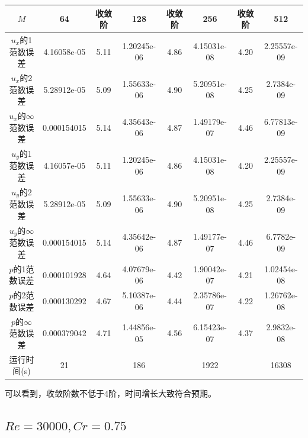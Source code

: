 \documentclass[lang=cn,10pt,bibend=bibtex]{elegantbook}
\begin{document}
\begin{table}[H]
  \centering
  \small
  \begin{tabular}{c|ccccccc}
  \textbf{$M$}              & 64          & 收敛阶 & 128         & 收敛阶 & 256         & 收敛阶 & 512   \\ \hline
  $u_x$的1范数误差                  & 4.16058e-05 &  5.11 & 1.20245e-06 &  4.86 & 4.15031e-08 &  4.20 & 2.25557e-09 \\
  $u_x$的2范数误差                  & 5.28912e-05 &  5.09 & 1.55633e-06 &  4.90 & 5.20951e-08 &  4.25 & 2.7384e-09 \\
  $u_x$的$\infty$范数误差           & 0.000154015 &  5.14 & 4.35643e-06 &  4.87 & 1.49179e-07 &  4.46 & 6.77813e-09 \\
  $u_y$的1范数误差                  & 4.16057e-05 &  5.11 & 1.20245e-06 &  4.86 & 4.15031e-08 &  4.20 & 2.25557e-09 \\
  $u_y$的2范数误差                  & 5.28912e-05 &  5.09 & 1.55633e-06 &  4.90 & 5.20951e-08 &  4.25 & 2.7384e-09 \\
  $u_y$的$\infty$范数误差           & 0.000154015 &  5.14 & 4.35642e-06 &  4.87 & 1.49177e-07 &  4.46 & 6.7782e-09 \\
  $p$的1范数误差                  & 0.000101928 &  4.64 & 4.07679e-06 &  4.42 & 1.90042e-07 &  4.21 & 1.02454e-08 \\
  $p$的2范数误差                  & 0.000130292 &  4.67 & 5.10387e-06 &  4.44 & 2.35786e-07 &  4.22 & 1.26762e-08 \\
  $p$的$\infty$范数误差           & 0.000379042 &  4.71 & 1.44856e-05 &  4.56 & 6.15423e-07 &  4.37 & 2.9832e-08 \\
  运行时间(s)                &      21      &       &     186      &       &     1922     &       &  16308
  \end{tabular}
\end{table}

可以看到，收敛阶数不低于4阶，时间增长大致符合预期。

\subsection{$Re=30000,Cr=0.75$}
\end{document}
